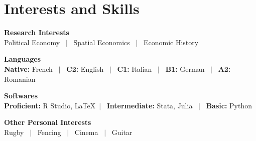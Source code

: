 \documentclass[a4paper,11pt]{article}
\begin{document}
\section{Interests and Skills}

\noindent
\newline
\textbf{Research Interests} \\
Political Economy \ $|$ \ Spatial Economics \ $|$ \ Economic History

\noindent
\textbf{Languages} \\
\textbf{Native:} French \ $|$ \ \textbf{C2:} English \ $|$ \ \textbf{C1:} Italian \ $|$ \ \textbf{B1:} German \ $|$ \ \textbf{A2:} Romanian

\noindent
\textbf{Softwares} \\
\textbf{Proficient:} R Studio, \LaTeX \ $|$ \ \textbf{Intermediate:} Stata, Julia \ $|$ \ \textbf{Basic:} Python 

\noindent
\textbf{Other Personal Interests} \\
Rugby \ $|$ \ Fencing \ $|$ \ Cinema \ $|$ \ Guitar

\vfill
{}
\end{document}
